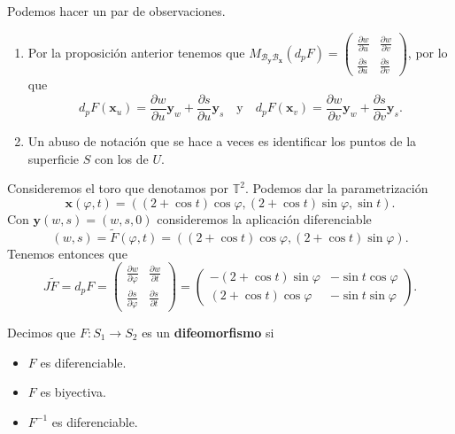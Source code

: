 \begin{observation} Podemos hacer un par de observaciones.
\begin{enumerate}
	\item Por la proposición anterior tenemos que $\displaystyle M_{\mathcal{B}_{ \textbf{y} }\mathcal{B}_{ \textbf{x} }}\left(d _{p}F\right) = \begin{pmatrix} \frac{\partial w}{\partial u} & \frac{\partial w}{\partial v} \\ \frac{\partial s}{\partial u} & \frac{\partial s}{\partial v} \end{pmatrix} $, por lo que 
		\[\boxed{d _{p}F\left( \textbf{x} _{u}\right)= \frac{\partial w}{\partial u} \textbf{y} _{w} + \frac{\partial s}{\partial u} \textbf{y} _{s} \quad \text{y} \quad
		d _{p}F\left( \textbf{x} _{v}\right) = \frac{\partial w}{\partial v} \textbf{y} _{w} + \frac{\partial s}{\partial v} \textbf{y} _{s}} .\]
	\item Un abuso de notación que se hace a veces es identificar los puntos de la superficie $\displaystyle S $ con los de $\displaystyle U $.  
\end{enumerate}
\end{observation}
\begin{eg}[Toro]
	Consideremos el toro que denotamos por $\displaystyle \mathbb{T}^{2} $. Podemos dar la parametrización
	\[ \textbf{x} \left(\varphi, t\right)=\left(\left(2 + \cos t\right)\cos \varphi, \left(2 + \cos t\right)\sin \varphi, \sin t\right) .\]
	Con $\displaystyle \textbf{y} \left(w,s\right)=\left(w,s,0\right) $ consideremos la aplicación diferenciable 
	\[\left(w,s\right)=\tilde{F}\left(\varphi, t\right)=\left(\left(2 + \cos t\right)\cos \varphi, \left(2 + \cos t\right)\sin \varphi\right) .\]
	Tenemos entonces que 
	\[J\tilde{F} = d _{p}F = \begin{pmatrix} \frac{\partial w}{\partial \varphi} & \frac{\partial w}{\partial t} \\ \frac{\partial s}{\partial \varphi} & \frac{\partial s}{\partial t} \end{pmatrix}=\begin{pmatrix} -\left(2 + \cos t\right)\sin \varphi & -\sin t \cos \varphi \\ \left(2 + \cos t\right)\cos \varphi & -\sin t \sin \varphi \end{pmatrix} .\]
\end{eg}
\begin{definition}[Difeomorfismo]
Decimos que $\displaystyle F : S_{1} \to S_{2} $ es un \textbf{difeomorfismo} si 
\begin{itemize}
\item $\displaystyle F $ es diferenciable.
\item $\displaystyle F $ es biyectiva.
\item $\displaystyle F^{-1} $ es diferenciable.
\end{itemize}
\end{definition}
